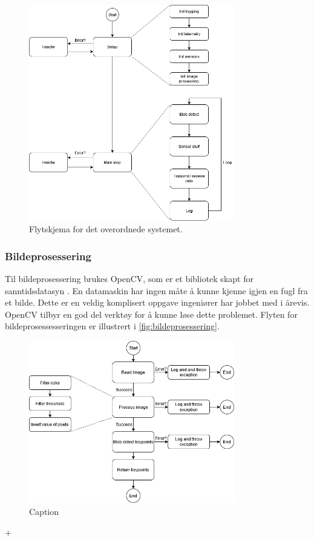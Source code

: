 \begin{figure}[H]
    \centering
    \includegraphics[width=0.8\textwidth]{implementering/hovedprogram.png}
    \caption{Flytskjema for det overordnede systemet.}
    \label{fig:hovedprogram}
\end{figure}

\subsubsection{Bildeprosessering}

Til bildeprosessering brukes OpenCV, som er et bibliotek skapt for sanntidsdatasyn . En datamaskin har ingen måte å kunne kjenne igjen en fugl fra et bilde. Dette er en veldig komplisert oppgave ingeniører har jobbet med i årevis. OpenCV tilbyr en god del verktøy for å kunne løse dette problemet. Flyten for bildeprosessesseringen er illustrert i \autoref{fig:bildeprosessering}.  

\begin{figure}[H]
    \centering
    \includegraphics[width=0.8\textwidth]{implementering/bildeprosessering.png}
    \caption{Caption}
    \label{fig:bildeprosessering}
\end{figure} +

